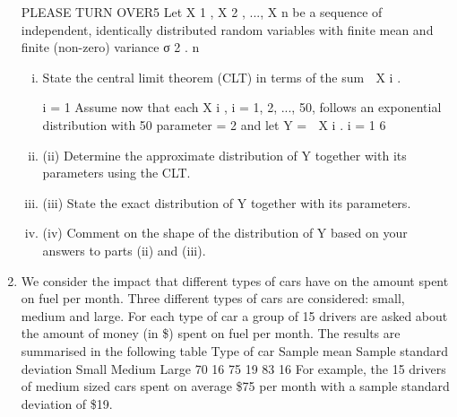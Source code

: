 \documentclass[a4paper,12pt]{article}
\begin{document}
\begin{enumerate}
PLEASE TURN OVER5
Let X 1 , X 2 , ..., X n be a sequence of independent, identically distributed random
variables with finite mean \mu and finite (non-zero) variance σ 2 .
n

\begin{enumerate}[(i)]
\item State the central limit theorem (CLT) in terms of the sum
 X i .

i = 1
Assume now that each X i , i = 1, 2, ..., 50, follows an exponential distribution with
50
parameter \lambda = 2 and let Y =  X i .
i = 1
6
\item (ii) Determine the approximate distribution of Y together with its parameters using
the CLT.

\item (iii) State the exact distribution of Y together with its parameters.
\item (iv) Comment on the shape of the distribution of Y based on your answers to parts
(ii) and (iii).

\end{enumerate}

\item We consider the impact that different types of cars have on the amount spent on fuel
per month. Three different types of cars are considered: small, medium and large.
For each type of car a group of 15 drivers are asked about the amount of money (in \$)
spent on fuel per month. The results are summarised in the following table
Type of car
Sample mean
Sample standard deviation
Small Medium Large
70
16
75
19
83
16
For example, the 15 drivers of medium sized cars spent on average \$75 per month
with a sample standard deviation of \$19.


\end{enumerate}
\end{document}
